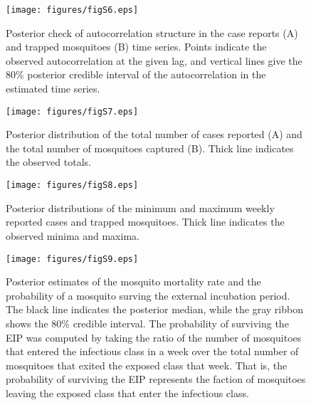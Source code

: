 \documentclass[12pt,letterpaper]{article}
\begin{document}
\begin{figure}[!h]
\texttt{[image: figures/figS6.eps]}
\caption{Posterior check of autocorrelation structure in the case reports (A) and trapped mosquitoes (B) time series.  Points indicate the observed autocorrelation at the given lag, and vertical lines give the 80\% posterior credible interval of the autocorrelation in the estimated time series.
}
\end{figure}

\begin{figure}[!h]
\texttt{[image: figures/figS7.eps]}
\caption{
Posterior distribution of the total number of cases reported (A) and the total number of mosquitoes captured (B).  Thick line indicates the observed totals.
}
\end{figure}

\begin{figure}[!h]
\texttt{[image: figures/figS8.eps]}
\caption{
Posterior distributions of the minimum and maximum weekly reported cases and trapped mosquitoes. Thick line indicates the observed minima and maxima.
}
\end{figure}

\begin{figure}[!h]
\texttt{[image: figures/figS9.eps]}
\caption{
Posterior estimates of the mosquito mortality rate and the probability of a mosquito surving the external incubation period.  The black line indicates the posterior median, while the gray ribbon shows the 80$\%$ credible interval.  The probability of surviving the EIP was computed by taking the ratio of the number of mosquitoes that entered the infectious class in a week over the total number of mosquitoes that exited the exposed class that week.  That is, the probability of surviving the EIP represents the faction of mosquitoes leaving the exposed class that enter the infectious class. 
}
\end{figure}
\end{document}

